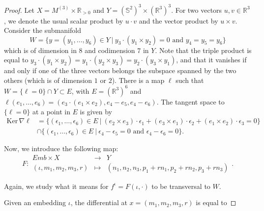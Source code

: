 \documentclass[11pt]{article}
\newcommand{\R}{\mathbb{R}}
\newcommand{\io}{\iota}
\newcommand{\eps}{\epsilon}
\newcommand{\inter}{\cap}
\newcommand{\grad}{\nabla}
\newcommand{\Ker}{\mathrm{Ker} \,}
\theoremstyle{plain}
\theoremstyle{definition}
\theoremstyle{remark}
\begin{document}
\begin{proof}
		Let $X = M^{(3)} \times \R_{>0}$ and $Y = (\mathbb{S}^2)^3 \times (\R^3)^3$. For two vectors $u,v \in \R^3$, we denote the usual scalar product by $u \cdot v$ and the vector product by $u \times v$. Consider the submanifold 
		\[ W = \{y = (y_1,\ldots, y_6)\in Y ~|~ y_3 \cdot (y_1 \times y_2) = 0 \text{ and } y_4 = y_5 = y_6 \} \]
		which is of dimension in $8$ and codimension $7$ in $Y$.
		Note that the triple product is equal to $y_3 \cdot (y_1 \times y_2) = y_1 \cdot (y_2 \times y_3) = y_2 \cdot (y_3 \times y_1)$, and that it vanishes if and only if one of the three vectors belongs the subspace spanned by the two others (which is of dimension $1$ or $2$). There is a map $\ell$ such that $W = \{\ell = 0\} \inter Y \subset E$, with $E = (\R^3)^6$ and
		$\ell(e_1,\ldots, e_6) = (e_3 \cdot (e_1 \times e_2), e_4 - e_5, e_4 - e_6)$. The tangent space to $\{\ell = 0\}$ at a point in $E$ is given by 
		\begin{align*}
			\Ker \grad \ell & = \{ (\eps_1,\ldots, \eps_6) \in E ~|~ (e_2 \times e_3) \cdot \eps_1 + (e_3 \times e_1) \cdot \eps_2 + (e_1 \times e_2) \cdot \eps_3 = 0 \} \\ 
			& \inter \{  (\eps_1,\ldots, \eps_6) \in E ~|~ \eps_4 - \eps_5 = 0 \text{ and } \eps_4 - \eps_6 = 0\}.
		\end{align*}
		
		Now, we introduce the following map:
		\begin{equation}
			F:
			\begin{array}{ccc}
				Emb \times X & \to & Y \\
				(\io, m_1,m_2,m_3,r) & \mapsto & (n_1, n_2, n_3, p_1 + r n_1, p_2 + r n_2 , p_3 + r n_3)
			\end{array}.
		\end{equation}
		
		Again, we study what it means for $f^\io = F(\io,\cdot)$ to be transversal to $W$.
		
		Given an embedding $\io$, the differential at $x = (m_1,m_2,m_3,r)$ is equal to
		

\end{proof}
\end{document}
